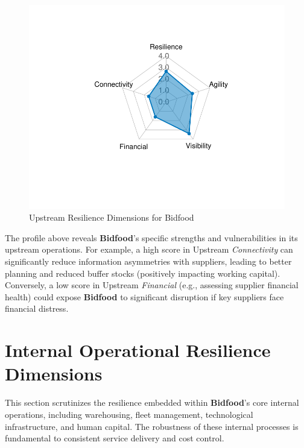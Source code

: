 \documentclass[
  oneside,
  open=any,
  fontsize=11pt]{scrbook}
\begin{document}
\begin{figure}[H]

{\centering \includegraphics[width=0.8\linewidth,height=\textheight,keepaspectratio]{example_3_files/figure-pdf/upstream-radar-chart-1.pdf}

}

\caption{Upstream Resilience Dimensions for Bidfood}

\end{figure}%

The profile above reveals \textbf{Bidfood}'s specific strengths and
vulnerabilities in its upstream operations. For example, a high score in
Upstream \emph{Connectivity} can significantly reduce information
asymmetries with suppliers, leading to better planning and reduced
buffer stocks (positively impacting working capital). Conversely, a low
score in Upstream \emph{Financial} (e.g., assessing supplier financial
health) could expose \textbf{Bidfood} to significant disruption if key
suppliers face financial distress.

\section{Internal Operational Resilience
Dimensions}\label{internal-operational-resilience-dimensions}

This section scrutinizes the resilience embedded within
\textbf{Bidfood}'s core internal operations, including warehousing,
fleet management, technological infrastructure, and human capital. The
robustness of these internal processes is fundamental to consistent
service delivery and cost control.
\end{document}
